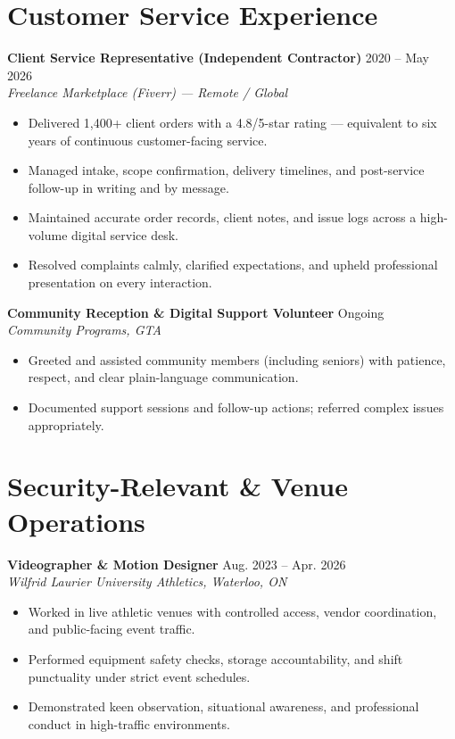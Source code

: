 \documentclass[a4paper,10pt]{article}
\begin{document}
\section*{Customer Service Experience}
\textbf{Client Service Representative (Independent Contractor)} \hfill 2020 -- May 2026 \\
\textit{Freelance Marketplace (Fiverr) — Remote / Global}
\begin{itemize}
    \item Delivered 1,400+ client orders with a 4.8/5-star rating — equivalent to six years of continuous customer-facing service.
    \item Managed intake, scope confirmation, delivery timelines, and post-service follow-up in writing and by message.
    \item Maintained accurate order records, client notes, and issue logs across a high-volume digital service desk.
    \item Resolved complaints calmly, clarified expectations, and upheld professional presentation on every interaction.
\end{itemize}

\vspace{3pt}
\textbf{Community Reception \& Digital Support Volunteer} \hfill Ongoing \\
\textit{Community Programs, GTA}
\begin{itemize}
    \item Greeted and assisted community members (including seniors) with patience, respect, and clear plain-language communication.
    \item Documented support sessions and follow-up actions; referred complex issues appropriately.
\end{itemize}

\section*{Security-Relevant \& Venue Operations}
\textbf{Videographer \& Motion Designer} \hfill Aug. 2023 -- Apr. 2026 \\
\textit{Wilfrid Laurier University Athletics, Waterloo, ON}
\begin{itemize}
    \item Worked in live athletic venues with controlled access, vendor coordination, and public-facing event traffic.
    \item Performed equipment safety checks, storage accountability, and shift punctuality under strict event schedules.
    \item Demonstrated keen observation, situational awareness, and professional conduct in high-traffic environments.
\end{itemize}
\end{document}

